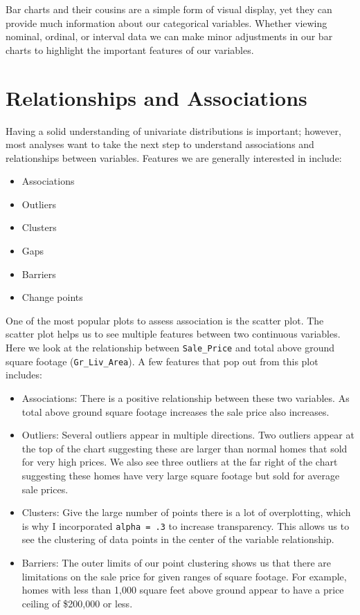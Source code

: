\documentclass[]{article}
\providecommand{\tightlist}{%
  \setlength{\itemsep}{0pt}\setlength{\parskip}{0pt}}
\begin{document}
Bar charts and their cousins are a simple form of visual display, yet
they can provide much information about our categorical variables.
Whether viewing nominal, ordinal, or interval data we can make minor
adjustments in our bar charts to highlight the important features of our
variables.

\section{Relationships and
Associations}\label{relationships-and-associations}

Having a solid understanding of univariate distributions is important;
however, most analyses want to take the next step to understand
associations and relationships between variables. Features we are
generally interested in include:

\begin{itemize}
\tightlist
\item
  Associations
\item
  Outliers
\item
  Clusters
\item
  Gaps
\item
  Barriers
\item
  Change points
\end{itemize}

One of the most popular plots to assess association is the scatter plot.
The scatter plot helps us to see multiple features between two
continuous variables. Here we look at the relationship between
\texttt{Sale\_Price} and total above ground square footage
(\texttt{Gr\_Liv\_Area}). A few features that pop out from this plot
includes:

\begin{itemize}
\tightlist
\item
  Associations: There is a positive relationship between these two
  variables. As total above ground square footage increases the sale
  price also increases.
\item
  Outliers: Several outliers appear in multiple directions. Two outliers
  appear at the top of the chart suggesting these are larger than normal
  homes that sold for very high prices. We also see three outliers at
  the far right of the chart suggesting these homes have very large
  square footage but sold for average sale prices.
\item
  Clusters: Give the large number of points there is a lot of
  overplotting, which is why I incorporated \texttt{alpha\ =\ .3} to
  increase transparency. This allows us to see the clustering of data
  points in the center of the variable relationship.
\item
  Barriers: The outer limits of our point clustering shows us that there
  are limitations on the sale price for given ranges of square footage.
  For example, homes with less than 1,000 square feet above ground
  appear to have a price ceiling of \$200,000 or less.
\end{itemize}
\end{document}
